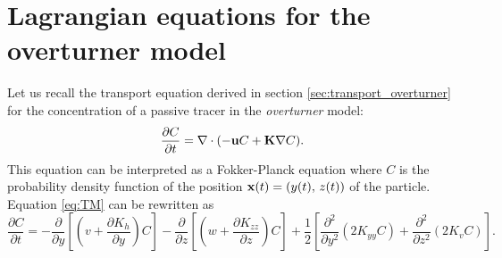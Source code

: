 \section{Lagrangian equations for the overturner model}
Let us recall the transport equation derived in section \eqref{sec:transport_overturner} for the concentration of a passive tracer in the \textit{overturner} model:
\begin{equation} \label{eq:TM}
	\frac{\partial C}{\partial t} = \nabla \cdot (-\mathbf u C + \mathbf K \nabla C).
\end{equation}
This equation can be interpreted as a Fokker-Planck equation where $C$ is the probability density function of the position $\mathbf x(t) = (y(t),\,z(t))$ of the particle. 
Equation \eqref{eq:TM} can be rewritten as
\begin{equation}
	\frac{\partial C}{\partial t} = -\frac{\partial}{\partial y}\left[\left(v+\frac{\partial K_{h}}{\partial y}\right)C\right] -\frac{\partial}{\partial z}\left[\left(w+ \frac{\partial K_{zz}}{\partial z}\right)C\right]	+ \frac{1}{2}\left[\frac{\partial^2}{\partial y^2} \left(2K_{yy} C\right) + \frac{\partial^2}{\partial z^2} \left(2K_v C\right) \right].
\end{equation}
